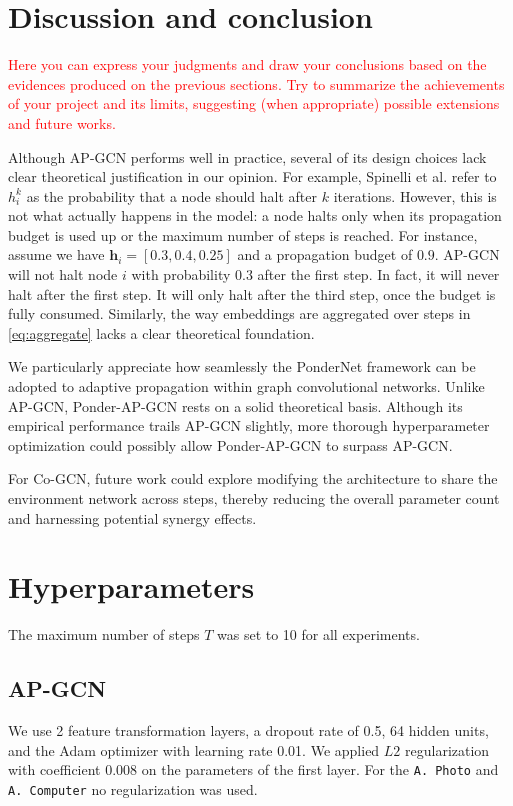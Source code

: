 \documentclass{gdl}
\begin{document}
\section{Discussion and conclusion}

\textcolor{red}{Here you can express your judgments and draw your conclusions based on the  evidences produced on the previous sections.
Try to summarize the achievements of your project and its limits, suggesting (when appropriate) possible extensions and future works.}

Although AP-GCN performs well in practice, several of its design choices lack clear theoretical justification in our opinion. For example, Spinelli et al. refer to $h_i^k$ as the probability that a node should halt after $k$ iterations. However, this is not what actually happens in the model: a node halts only when its propagation budget is used up or the maximum number of steps is reached. For instance, assume we have $\mathbf{h}_i = [0.3, 0.4, 0.25]$ and a propagation budget of $0.9$. AP-GCN will not halt node $i$ with probability $0.3$ after the first step. In fact, it will never halt after the first step. It will only halt after the third step, once the budget is fully consumed. Similarly, the way embeddings are aggregated over steps in \autoref{eq:aggregate} lacks a clear theoretical foundation.

We particularly appreciate how seamlessly the PonderNet framework can be adopted to adaptive propagation within graph convolutional networks. Unlike AP-GCN, Ponder-AP-GCN rests on a solid theoretical basis. Although its empirical performance trails AP-GCN slightly, more thorough hyperparameter optimization could possibly allow Ponder-AP-GCN to surpass AP-GCN.

For Co-GCN, future work could explore modifying the architecture to share the environment network across steps, thereby reducing the overall parameter count and harnessing potential synergy effects.


\clearpage


\clearpage

\appendix

\section{Hyperparameters}
The maximum number of steps $T$ was set to 10 for all experiments.

\subsection{AP-GCN}
\label{lab:hyper-ap-gcn}
We use 2 feature transformation layers, a dropout rate of 0.5, 64 hidden units, and the Adam optimizer with learning rate 0.01. We applied $L2$ regularization with coefficient 0.008 on the parameters of the first layer. For the \texttt{A. Photo} and \texttt{A. Computer} no regularization was used.
\end{document}
